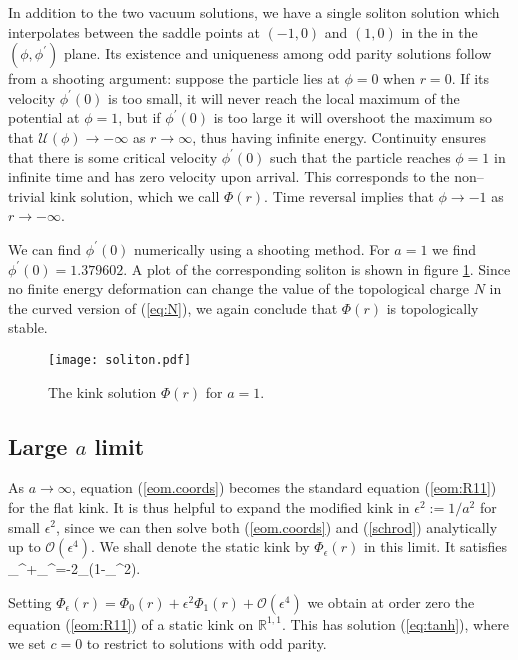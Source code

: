 In addition to the two vacuum solutions, we have a single soliton solution which interpolates between the saddle points at $(-1,0)$ and $(1,0)$ in the in the $(\phi,\phi^\prime)$ plane. Its existence and uniqueness among odd parity solutions follow from a shooting argument: suppose the particle lies at $\phi=0$ when $r=0$. If its velocity $\phi^\prime(0)$ is too small, it will never reach the local maximum of the potential at $\phi=1$, but if $\phi^\prime(0)$ is too large it will overshoot the maximum so that $\mathcal{U}(\phi)\rightarrow -\infty$ as $r\rightarrow\infty$, thus having infinite energy. Continuity ensures that there is some critical velocity $\phi^\prime(0)$ such that the particle reaches $\phi=1$ in infinite time and has zero velocity upon arrival. This corresponds to the non--trivial kink solution, which we call $\Phi(r)$. Time reversal implies that $\phi\rightarrow -1$ as $r\rightarrow -\infty$.

We can find $\phi^\prime(0)$ numerically using a shooting method. For $a=1$ we find $\phi^\prime(0)=1.379602$. A plot of the corresponding soliton is shown in figure \ref{fig:soliton}. Since no finite energy deformation can change the value of the topological charge $N$ in the curved version of (\ref{eq:N}), we again conclude that $\Phi(r)$ is topologically stable.

\begin{figure}
\texttt{[image: soliton.pdf]}
\caption{\label{fig:soliton}The kink solution $\Phi(r)$ for $a=1$.}
\end{figure}
 

\subsection{Large $a$ limit}
As $a\rightarrow\infty$, equation (\ref{eom.coords}) becomes the standard equation (\ref{eom:R11}) for the flat kink. It is thus helpful to expand the modified kink in $\epsilon^2:=1/a^2$ for small $\epsilon^2$, since we can then solve both (\ref{eom.coords}) and (\ref{schrod}) analytically up to $\mathcal{O}(\epsilon^4)$. We shall denote the static kink by $\Phi_\epsilon(r)$ in this limit. It satisfies
\be
\label{eq.large_a}
\Phi_\epsilon^{\prime\prime}+\Phi_\epsilon^{\prime}=-2\Phi_\epsilon(1-\Phi_\epsilon^2).
\ee

Setting $\Phi_\epsilon(r)=\Phi_0(r)+\epsilon^2\Phi_1(r)+\mathcal{O}(\epsilon^4)$ we obtain at order zero the equation (\ref{eom:R11}) of a static kink on $\mathbb{R}^{1,1}$. This has solution (\ref{eq:tanh}), where we set $c=0$ to restrict to solutions with odd parity.

